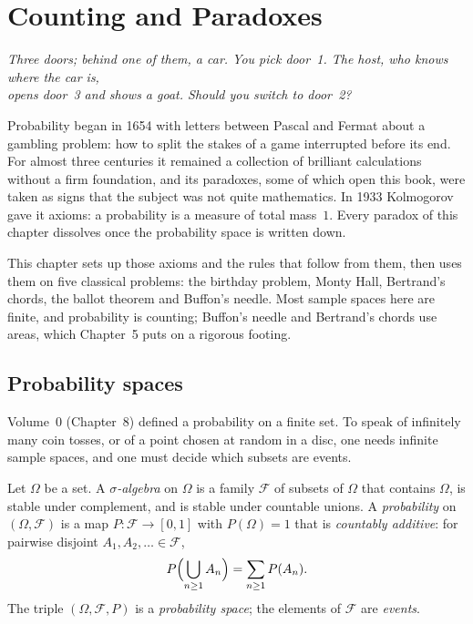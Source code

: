 \chapter{Counting and Paradoxes}

\begin{center}\itshape
Three doors; behind one of them, a car. You pick door~1. The host, who knows where the car is,\\
opens door~3 and shows a goat. Should you switch to door~2?
\end{center}

Probability began in 1654 with letters between Pascal and Fermat about a gambling problem: how to split the
stakes of a game interrupted before its end. For almost three centuries it remained a collection of brilliant
calculations without a firm foundation, and its paradoxes, some of which open this book, were taken as signs
that the subject was not quite mathematics. In 1933 Kolmogorov gave it axioms: a probability is a measure of
total mass~$1$. Every paradox of this chapter dissolves once the probability space is written down.

This chapter sets up those axioms and the rules that follow from them, then uses them on five classical
problems: the birthday problem, Monty Hall, Bertrand's chords, the ballot theorem and Buffon's needle. Most
sample spaces here are finite, and probability is counting; Buffon's needle and Bertrand's chords use areas,
which Chapter~5 puts on a rigorous footing.

\section{Probability spaces}

Volume~0 (Chapter~8) defined a probability on a finite set. To speak of infinitely many coin tosses, or of a point
chosen at random in a disc, one needs infinite sample spaces, and one must decide which subsets are events.

\begin{definition}
Let $\Omega$ be a set. A \emph{$\sigma$-algebra} on $\Omega$ is a family $\mathcal F$ of subsets of $\Omega$ that
contains $\Omega$, is stable under complement, and is stable under countable unions. A \emph{probability} on
$(\Omega,\mathcal F)$ is a map $P:\mathcal F\to[0,1]$ with $P(\Omega)=1$ that is \emph{countably additive}: for
pairwise disjoint $A_1,A_2,\ldots\in\mathcal F$,
\[
P\Bigl(\bigcup_{n\ge1}A_n\Bigr)=\sum_{n\ge1}P(A_n).
\]
The triple $(\Omega,\mathcal F,P)$ is a \emph{probability space}; the elements of $\mathcal F$ are \emph{events}.
\end{definition}


